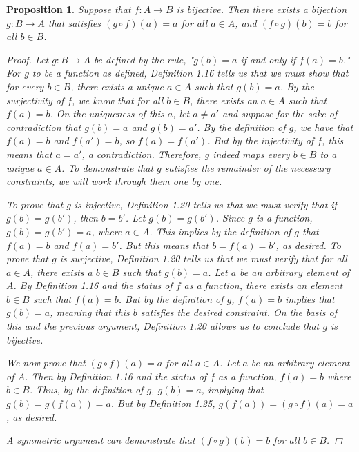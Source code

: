 \documentclass[titlepage]{article}
\newcounter{script}
\newtheorem{proposition}{Proposition}[script]
\theoremstyle{definition}
\begin{document}
\setcounter{proposition}{26}

\begin{proposition}
    Suppose that $f:A\to B$ is bijective. Then there exists a bijection $g:B\to A$ that satisfies $(g\circ f)(a)=a$ for all $a\in A$, and $(f\circ g)(b)=b$ for all $b\in B$.
    \begin{proof}
        Let $g:B\to A$ be defined by the rule, "$g(b)=a$ if and only if $f(a)=b$." For $g$ to be a function as defined, Definition 1.16 tells us that we must show that for every $b\in B$, there exists a unique $a\in A$ such that $g(b)=a$. By the surjectivity of $f$, we know that for all $b\in B$, there exists \emph{an} $a\in A$ such that $f(a)=b$. On the uniqueness of this $a$, let $a\neq a'$ and suppose for the sake of contradiction that $g(b)=a$ and $g(b)=a'$. By the definition of $g$, we have that $f(a)=b$ and $f(a')=b$, so $f(a)=f(a')$. But by the injectivity of $f$, this means that $a=a'$, a contradiction. Therefore, $g$ indeed maps every $b\in B$ to a unique $a\in A$. To demonstrate that $g$ satisfies the remainder of the necessary constraints, we will work through them one by one.\par
        To prove that $g$ is injective, Definition 1.20 tells us that we must verify that if $g(b)=g(b')$, then $b=b'$. Let $g(b)=g(b')$. Since $g$ is a function, $g(b)=g(b')=a$, where $a\in A$. This implies by the definition of $g$ that $f(a)=b$ and $f(a)=b'$. But this means that $b=f(a)=b'$, as desired. To prove that $g$ is surjective, Definition 1.20 tells us that we must verify that for all $a\in A$, there exists a $b\in B$ such that $g(b)=a$. Let $a$ be an arbitrary element of $A$. By Definition 1.16 and the status of $f$ as a function, there exists an element $b\in B$ such that $f(a)=b$. But by the definition of $g$, $f(a)=b$ implies that $g(b)=a$, meaning that this $b$ satisfies the desired constraint. On the basis of this and the previous argument, Definition 1.20 allows us to conclude that $g$ is bijective.\par
        We now prove that $(g\circ f)(a)=a$ for all $a\in A$. Let $a$ be an arbitrary element of $A$. Then by Definition 1.16 and the status of $f$ as a function, $f(a)=b$ where $b\in B$. Thus, by the definition of $g$, $g(b)=a$, implying that $g(b)=g(f(a))=a$. But by Definition 1.25, $g(f(a))=(g\circ f)(a)=a$, as desired.\par
        A symmetric argument can demonstrate that $(f\circ g)(b)=b$ for all $b\in B$.
    \end{proof}
\end{proposition}
\end{document}
